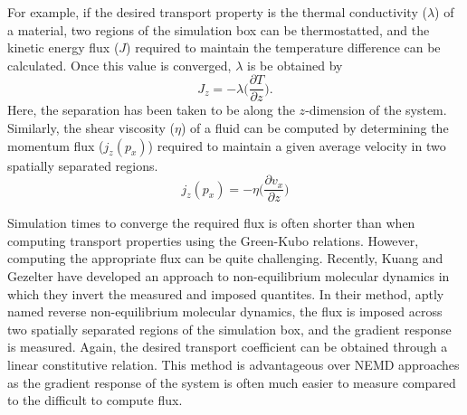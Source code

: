 For example, if the desired transport property is the thermal conductivity
($\lambda$) of a material, two regions of the simulation box can be
thermostatted, and the kinetic energy flux ($J$) required to maintain
the temperature difference can be calculated. Once this value is
converged, $\lambda$ is be obtained by
\begin{equation}\label{thermalTransport}
J_{z} = - \lambda \big(\frac{\partial T}{\partial z}\big).
\end{equation}
Here, the separation has been taken to be along the $z$-dimension of
the system.  Similarly, the shear viscosity ($\eta$) of a fluid can be
computed by determining the momentum flux ($ j_{z}(p_{x})$) required
to maintain a given average velocity in two spatially separated
regions.
\begin{equation}\label{momentumTransport}
  j_{z}(p_{x}) = -\eta \big(\frac{\partial v_{x}}{\partial z}\big)
\end{equation}

Simulation times to converge the required flux is often shorter than
when computing transport properties using the Green-Kubo
relations. However, computing the appropriate flux can be quite
challenging. Recently, Kuang and Gezelter have developed an approach
to non-equilibrium molecular dynamics in which they invert the
measured and imposed quantites.\cite{Kuang2010,Kuang2012} In their
method, aptly named reverse non-equilibrium molecular dynamics, the
flux is imposed across two spatially separated regions of the
simulation box, and the gradient response is measured. Again, the
desired transport coefficient can be obtained through a linear
constitutive relation. This method is advantageous over NEMD
approaches as the gradient response of the system is often much easier
to measure compared to the difficult to compute flux.


